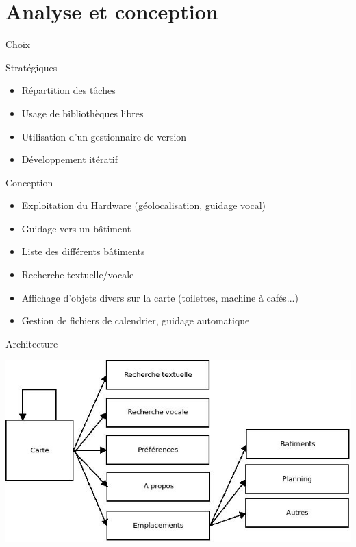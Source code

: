 \documentclass{beamer}
\begin{document}
		\section{Analyse et conception}
		\begin{frame}{Choix}
			\begin{block}{Stratégiques}
				\begin{itemize}
					\item Répartition des tâches
					\item Usage de bibliothèques libres
					\item Utilisation d'un gestionnaire de version
					\item Développement itératif
				\end{itemize}
			\end{block}		
			\pause
			\begin{block}{Conception}
				\begin{itemize}
					\item Exploitation du Hardware (géolocalisation, guidage vocal)
					\item Guidage vers un bâtiment
					\item Liste des différents bâtiments
					\item Recherche textuelle/vocale
					\item Affichage d'objets divers sur la carte (toilettes, machine à cafés...)
					\item Gestion de fichiers de calendrier, guidage automatique
				\end{itemize}
			\end{block}
		\end{frame}
		
		\begin{frame}{Architecture}
			\begin{center}
				\includegraphics[scale=0.5]{diagram.jpeg}
			\end{center}
		\end{frame}
		
\end{document}

